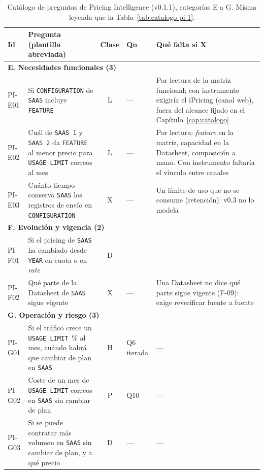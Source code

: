 \begin{table}[H]
\centering
\small
\begin{tabular}{|l|p{5.4cm}|c|p{2.3cm}|p{3.1cm}|}
\hline
\textbf{Id} & \textbf{Pregunta (plantilla abreviada)} & \textbf{Clase} &
\textbf{Qn} & \textbf{Qué falta si X} \\
\hline
\multicolumn{5}{|l|}{\textbf{E. Necesidades funcionales (3)}} \\
\hline
PI-E01 & Si \texttt{CONFIGURATION} de \texttt{SAAS} incluye \texttt{FEATURE} & L & --- & Por lectura de la matriz funcional; con instrumento exigiría el iPricing (canal web), fuera del alcance fijado en el Capítulo~\ref{cap:catalogo} \\
\hline
PI-E02 & Cuál de \texttt{SAAS 1} y \texttt{SAAS 2} da \texttt{FEATURE} al menor precio para \texttt{USAGE LIMIT} correos al mes & L & --- & Por lectura: \textit{feature} en la matriz, capacidad en la Datasheet, composición a mano. Con instrumento faltaría el vínculo entre canales \\
\hline
PI-E03 & Cuánto tiempo conserva \texttt{SAAS} los registros de envío en \texttt{CONFIGURATION} & X & --- & Un límite de uso que no se consume (retención): v0.3 no lo modela \\
\hline
\multicolumn{5}{|l|}{\textbf{F. Evolución y vigencia (2)}} \\
\hline
PI-F01 & Si el pricing de \texttt{SAAS} ha cambiado desde \texttt{YEAR} en cuota o en \textit{rate} & D & --- & --- \\
\hline
PI-F02 & Qué parte de la Datasheet de \texttt{SAAS} sigue vigente & X & --- & Una Datasheet no dice qué parte sigue vigente (F-09): exige reverificar fuente a fuente \\
\hline
\multicolumn{5}{|l|}{\textbf{G. Operación y riesgo (3)}} \\
\hline
PI-G01 & Si el tráfico crece un \texttt{USAGE LIMIT}~\% al mes, cuándo habrá que cambiar de plan en \texttt{SAAS} & H & Q6 iterada & --- \\
\hline
PI-G02 & Coste de un mes de \texttt{USAGE LIMIT} correos en \texttt{SAAS} sin cambiar de plan & P & Q10 & --- \\
\hline
PI-G03 & Si se puede contratar más volumen en \texttt{SAAS} sin cambiar de plan, y a qué precio & D & --- & --- \\
\hline
\end{tabular}
\caption{Catálogo de preguntas de Pricing Intelligence (v0.1.1), categorías E a G. Misma
leyenda que la Tabla~\ref{tab:catalogo-pi-1}.}
\label{tab:catalogo-pi-3}
\end{table}

